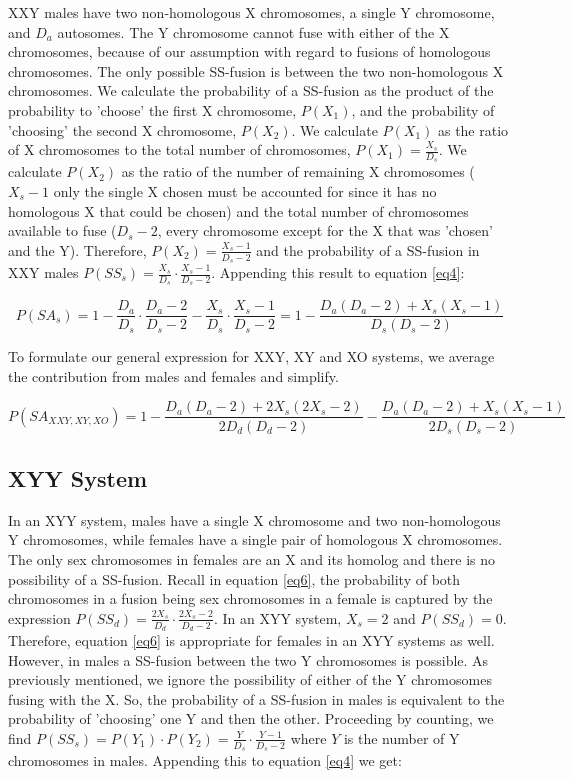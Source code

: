 \documentclass[12pt]{article}
\begin{document}
XXY males have two non-homologous X chromosomes, a single Y chromosome, and $D_a$ autosomes.
The Y chromosome cannot fuse with either of the X chromosomes, because of our assumption with regard to fusions of homologous chromosomes. 
The only possible SS-fusion is between the two non-homologous X chromosomes. 
We calculate the probability of a SS-fusion as the product of the probability to 'choose' the first X chromosome, $P(X_1)$, and the probability of 'choosing' the second X chromosome, $P(X_2)$. 
We calculate $P(X_1)$ as the ratio of X chromosomes to the total number of chromosomes, $P(X_1) = \frac{X_s}{D_s}$.
We calculate $P(X_2)$ as the ratio of the number of remaining X chromosomes ($X_s - 1$ only the single X chosen must be accounted for since it has no homologous X that could be chosen) and the total number of chromosomes available to fuse ($D_s - 2 $, every chromosome except for the X that was 'chosen' and the Y).  
Therefore, $P(X_2) = \frac{X_s - 1}{D_s - 2}$ and the probability of a SS-fusion in XXY males $P(SS_s) = \frac{X_s}{D_s} \cdot \frac{X_s - 1}{D_s - 2}$.
Appending this result to equation \ref{eq4}:

    \begin{equation} \label{eq7}
        P(SA_s) = 1 - \frac{D_a}{D_s} \cdot \frac{D_a - 2}{D_s - 2} - \frac{X_s}{D_s} \cdot \frac{X_s - 1}{D_s - 2} = 1 - \frac{D_a(D_a - 2) + X_s(X_s-1)}{D_s(D_s-2)}
    \end{equation}
    
To formulate our general expression for XXY, XY and XO systems, we average the contribution from males and females and simplify.

\begin{equation} \label{eq8}
P(SA_{XXY, XY, XO}) = 1 -\frac{D_a(D_a-2) + 2X_s(2X_s-2)}{2D_d(D_d-2)} - \frac{D_a(D_a - 2) + X_s(X_s-1)}{2D_s(D_s-2)}
\end{equation}

\subsection{XYY System}
In an XYY system, males have a single X chromosome and two non-homologous Y chromosomes, while females have a single pair of homologous X chromosomes.
The only sex chromosomes in females are an X and its homolog and there is no possibility of a SS-fusion.
Recall in equation \ref{eq6}, the probability of both chromosomes in a fusion being sex chromosomes in a female is captured by the expression $P(SS_d) = \frac{2X_s}{D_d} \cdot \frac{2X_s-2}{D_d-2}$. In an XYY system, $X_s=2$ and $P(SS_d) = 0$. 
Therefore, equation \ref{eq6} is appropriate for females in an XYY systems as well.
However, in males a SS-fusion between the two Y chromosomes is possible.
As previously mentioned, we ignore the possibility of either of the Y chromosomes fusing with the X.
So, the probability of a SS-fusion in males is equivalent to the probability of 'choosing' one Y and then the other. 
Proceeding by counting, we find $ P(SS_s) = P(Y_1) \cdot P(Y_2) = \frac{Y}{D_s} \cdot \frac{Y - 1}{D_s - 2}$ where $Y$ is the number of Y chromosomes in males.
Appending this to equation \ref{eq4} we get:
\end{document}
